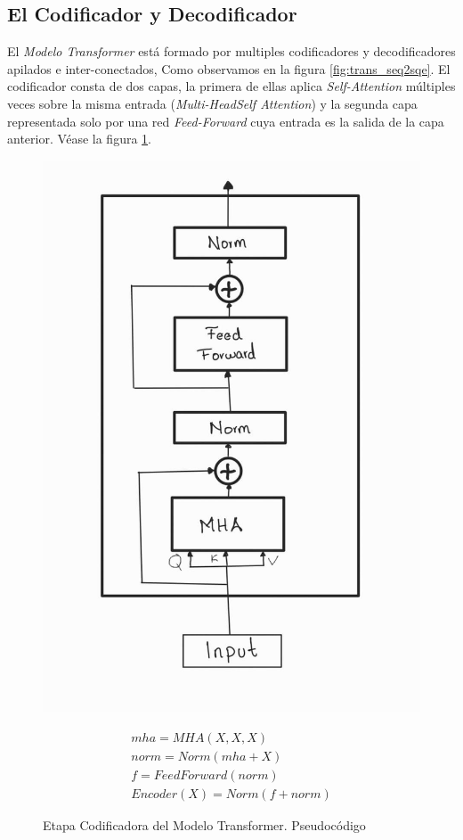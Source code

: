 \subsection{El Codificador y Decodificador}

El \textit{Modelo Transformer} está formado por multiples codificadores  y decodificadores apilados e inter-conectados,
Como observamos en la figura \ref{fig:trans_seq2sqe}. El codificador consta de dos capas,
la primera de ellas aplica \textit{Self-Attention} múltiples veces sobre la misma entrada
(\textit{Multi-HeadSelf Attention}) y la segunda capa representada solo por una red
\textit{Feed-Forward} cuya entrada es la salida de la capa anterior.
Véase la figura \ref{fig:trans_encoder}.


\begin{figure}[ht!]
\centering
    \begin{minipage}{.4\textwidth}
        \centering
        \includegraphics[width=0.7 \textwidth]{Chapters/1. Transformer/Figures/transformer/encoder.jpg}
    \end{minipage}
    \begin{minipage}{.5\textwidth}
        \begin{equation*}
            \begin{split}
                mha = MHA(X, X, X)\\
                norm = Norm( mha + X)\\
                f = FeedForward(norm)\\
                Encoder(X) = Norm(f + norm)
            \end{split}
            \label{eq:trans_enc}
        \end{equation*}
    \end{minipage}
    \caption{Etapa Codificadora del Modelo Transformer. Pseudocódigo}
    \label{fig:trans_encoder}
\end{figure}


